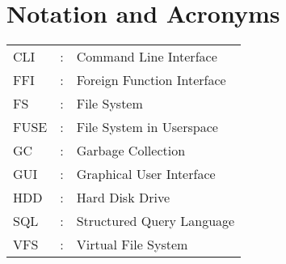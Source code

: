 \chapter*{Notation and Acronyms}
\vspace{1cm}

\noindent
\begin{tabular}{lcl}
    CLI &: & Command Line Interface \\
    FFI &: & Foreign Function Interface \\
    FS &: & File System \\
    FUSE &: & File System in Userspace \\
    GC &: & Garbage Collection \\
    GUI &: & Graphical User Interface \\
    HDD &: & Hard Disk Drive \\
    SQL &: & Structured Query Language \\
    VFS &: & Virtual File System \\
\end{tabular}
